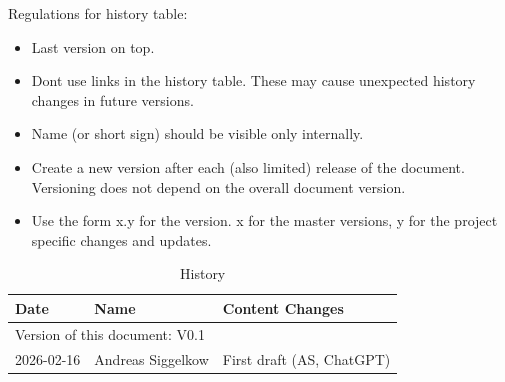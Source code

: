 Regulations for history table:
\begin{itemize}
  \item Last version on top.
  \item Dont use links in the history table. These may cause unexpected history changes in future versions.
  \item Name (or short sign) should be visible only internally.
  \item Create a new version after each (also limited) release of the document. Versioning does not depend on the overall document version.
  \item Use the form x.y for the version. x for the master versions, y for the project specific changes and updates.
\end{itemize}

\begin{table}[H]
\caption{History}
\label{tab:gpiohistory01a}
\centering
\begin{tabularx}{\textwidth}{|X |X |X |}
  \hline
  Date & Name & Content Changes \\
  \hline
  \multicolumn{3}{|l|}{Version of this document: V0.1} \\
  \hline
  2026-02-16 & Andreas Siggelkow & First draft (AS, ChatGPT) \\
  \hline
\end{tabularx}
\end{table}
